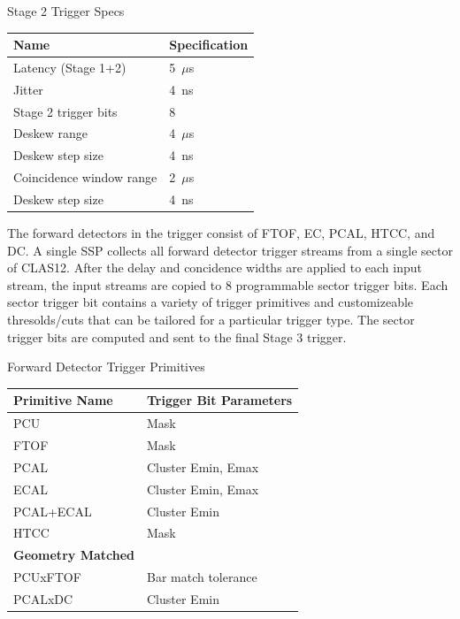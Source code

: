 \begin{center}
	Stage 2 Trigger Specs\\
	\begin{tabular}{| l | l |}
		\hline \hline
		Name				& Specification	\\
		\hline
		Latency (Stage 1+2)		& 5~$\mu$s	\\
		Jitter				& 4~ns		\\
		Stage 2 trigger bits		& 8		\\
		Deskew range			& 4~$\mu$s	\\
		Deskew step size		& 4~ns	\\
		Coincidence window range	& 2~$\mu$s	\\
		Deskew step size		& 4~ns	\\
		\hline \hline
	\end{tabular}
\end{center}

The forward detectors in the trigger consist of FTOF, EC, PCAL, HTCC, and DC. A single SSP collects all forward detector trigger streams from a single sector of CLAS12. After the delay and concidence widths are applied to each input stream, the input streams are copied to 8 programmable sector trigger bits. Each sector trigger bit contains a variety of trigger primitives and customizeable thresolds/cuts that can be tailored for a particular trigger type. The sector trigger bits are computed and sent to the final Stage 3 trigger.

\begin{center}
	Forward Detector Trigger Primitives\\
	\begin{tabular}{| l | l |}
		\hline \hline
		Primitive Name			& Trigger Bit Parameters	\\
		\hline
		PCU     			& Mask				\\
		FTOF    			& Mask				\\
		PCAL				& Cluster Emin, Emax		\\
		ECAL				& Cluster Emin, Emax		\\
		PCAL+ECAL			& Cluster Emin			\\
		HTCC				& Mask				\\
		{\bf Geometry Matched}		&				\\
		PCUxFTOF			& Bar match tolerance		\\
		PCALxDC				& Cluster Emin			\\
		\hline \hline
	\end{tabular}
\end{center}

